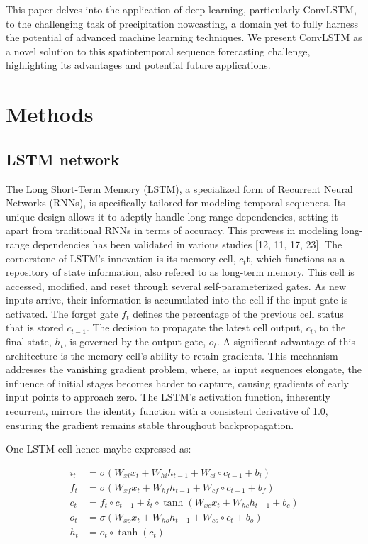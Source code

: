 \documentclass[
]{agujournal2019}
\begin{document}
This paper delves into the application of deep learning, particularly
ConvLSTM, to the challenging task of precipitation nowcasting, a domain
yet to fully harness the potential of advanced machine learning
techniques. We present ConvLSTM as a novel solution to this
spatiotemporal sequence forecasting challenge, highlighting its
advantages and potential future applications.

\hypertarget{methods}{%
\section{Methods}\label{methods}}

\hypertarget{lstm-network}{%
\subsection{LSTM network}\label{lstm-network}}

The Long Short-Term Memory (LSTM), a specialized form of Recurrent
Neural Networks (RNNs), is specifically tailored for modeling temporal
sequences. Its unique design allows it to adeptly handle long-range
dependencies, setting it apart from traditional RNNs in terms of
accuracy. This prowess in modeling long-range dependencies has been
validated in various studies {[}12, 11, 17, 23{]}. The cornerstone of
LSTM's innovation is its memory cell, \(c_t\)t, which functions as a
repository of state information, also refered to as long-term memory.
This cell is accessed, modified, and reset through several
self-parameterized gates. As new inputs arrive, their information is
accumulated into the cell if the input gate is activated. The forget
gate \(f_t\) defines the percentage of the previous cell status that is
stored \(c_{t-1}\)\hspace{0pt}. The decision to propagate the latest
cell output, \(c_t\), to the final state, \(h_t\), is governed by the
output gate, \(o_t\). A significant advantage of this architecture is
the memory cell's ability to retain gradients. This mechanism addresses
the vanishing gradient problem, where, as input sequences elongate, the
influence of initial stages becomes harder to capture, causing gradients
of early input points to approach zero. The LSTM's activation function,
inherently recurrent, mirrors the identity function with a consistent
derivative of 1.0, ensuring the gradient remains stable throughout
backpropagation.

One LSTM cell hence maybe expressed as:

\[
\begin{aligned}
i_t &= \sigma(W_{xi} x_t + W_{hi} h_{t-1} + W_{ci} \circ c_{t-1} + b_i) \\
f_t &= \sigma(W_{xf} x_t + W_{hf} h_{t-1} + W_{cf} \circ c_{t-1} + b_f) \\
c_t &= f_t \circ c_{t-1} + i_t \circ \tanh(W_{xc} x_t + W_{hc} h_{t-1} + b_c) \\
o_t &= \sigma(W_{xo} x_t + W_{ho} h_{t-1} + W_{co} \circ c_t + b_o) \\
h_t &= o_t \circ \tanh(c_t)
\end{aligned}
\]
\end{document}
